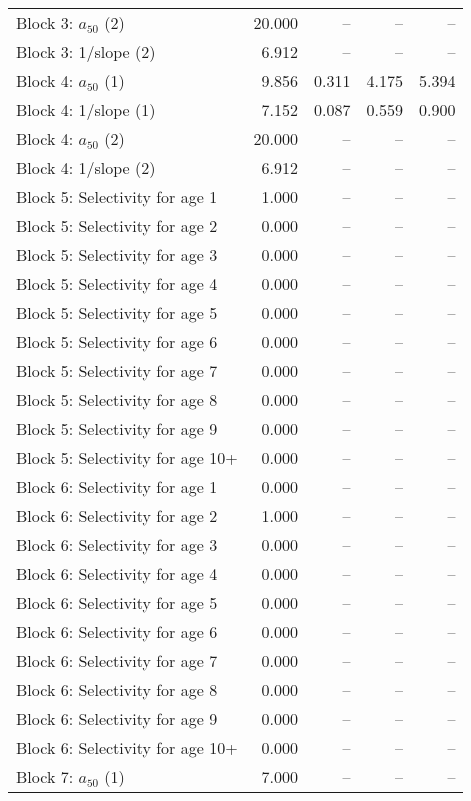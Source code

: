 \documentclass[
]{article}
\begin{document}
\begin{landscape}
\begin{longtable}[t]{lrrrr}
Block 3: $a_{50}$ (2) & 20.000 & -- & -- & --\\
Block 3: 1/slope (2) & 6.912 & -- & -- & --\\
Block 4: $a_{50}$ (1) & 9.856 & 0.311 & 4.175 & 5.394\\
Block 4: 1/slope (1) & 7.152 & 0.087 & 0.559 & 0.900\\
Block 4: $a_{50}$ (2) & 20.000 & -- & -- & --\\
\addlinespace
Block 4: 1/slope (2) & 6.912 & -- & -- & --\\
Block 5: Selectivity for age 1 & 1.000 & -- & -- & --\\
Block 5: Selectivity for age 2 & 0.000 & -- & -- & --\\
Block 5: Selectivity for age 3 & 0.000 & -- & -- & --\\
Block 5: Selectivity for age 4 & 0.000 & -- & -- & --\\
\addlinespace
Block 5: Selectivity for age 5 & 0.000 & -- & -- & --\\
Block 5: Selectivity for age 6 & 0.000 & -- & -- & --\\
Block 5: Selectivity for age 7 & 0.000 & -- & -- & --\\
Block 5: Selectivity for age 8 & 0.000 & -- & -- & --\\
Block 5: Selectivity for age 9 & 0.000 & -- & -- & --\\
\addlinespace
Block 5: Selectivity for age 10+ & 0.000 & -- & -- & --\\
Block 6: Selectivity for age 1 & 0.000 & -- & -- & --\\
Block 6: Selectivity for age 2 & 1.000 & -- & -- & --\\
Block 6: Selectivity for age 3 & 0.000 & -- & -- & --\\
Block 6: Selectivity for age 4 & 0.000 & -- & -- & --\\
\addlinespace
Block 6: Selectivity for age 5 & 0.000 & -- & -- & --\\
Block 6: Selectivity for age 6 & 0.000 & -- & -- & --\\
Block 6: Selectivity for age 7 & 0.000 & -- & -- & --\\
Block 6: Selectivity for age 8 & 0.000 & -- & -- & --\\
Block 6: Selectivity for age 9 & 0.000 & -- & -- & --\\
\addlinespace
Block 6: Selectivity for age 10+ & 0.000 & -- & -- & --\\
Block 7: $a_{50}$ (1) & 7.000 & -- & -- & --\\

\end{longtable}
\end{landscape}
\end{document}
